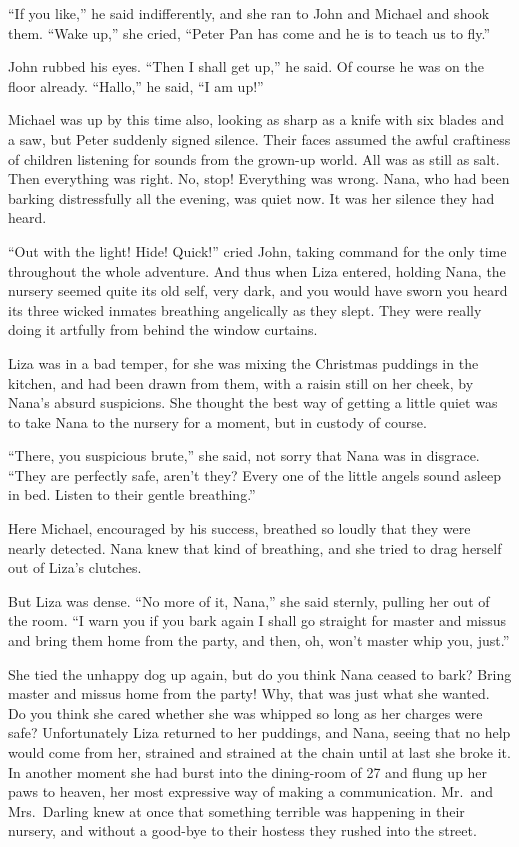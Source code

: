 ``If you like,'' he said indifferently, and she ran to John and Michael and
shook them. ``Wake up,'' she cried, ``Peter Pan has come and he is to teach us
to fly.''

John rubbed his eyes. ``Then I shall get up,'' he said. Of course he was on the
floor already. ``Hallo,'' he said, ``I am up!''

Michael was up by this time also, looking as sharp as a knife with six blades
and a saw, but Peter suddenly signed silence. Their faces assumed the awful
craftiness of children listening for sounds from the grown-up world. All was as
still as salt. Then everything was right. No, stop! Everything was wrong. Nana,
who had been barking distressfully all the evening, was quiet now. It was her
silence they had heard.

``Out with the light! Hide! Quick!'' cried John, taking command for the only
time throughout the whole adventure. And thus when Liza entered, holding Nana,
the nursery seemed quite its old self, very dark, and you would have sworn you
heard its three wicked inmates breathing angelically as they slept. They were
really doing it artfully from behind the window curtains.

Liza was in a bad temper, for she was mixing the Christmas puddings in the
kitchen, and had been drawn from them, with a raisin still on her cheek, by
Nana's absurd suspicions. She thought the best way of getting a little quiet was
to take Nana to the nursery for a moment, but in custody of course.

``There, you suspicious brute,'' she said, not sorry that Nana was in disgrace.
``They are perfectly safe, aren't they? Every one of the little angels sound
asleep in bed. Listen to their gentle breathing.''

Here Michael, encouraged by his success, breathed so loudly that they were
nearly detected. Nana knew that kind of breathing, and she tried to drag herself
out of Liza's clutches.

But Liza was dense. ``No more of it, Nana,'' she said sternly, pulling her out
of the room. ``I warn you if you bark again I shall go straight for master and
missus and bring them home from the party, and then, oh, won't master whip you,
just.''

She tied the unhappy dog up again, but do you think Nana ceased to bark? Bring
master and missus home from the party! Why, that was just what she wanted. Do
you think she cared whether she was whipped so long as her charges were safe?
Unfortunately Liza returned to her puddings, and Nana, seeing that no help would
come from her, strained and strained at the chain until at last she broke it. In
another moment she had burst into the dining-room of 27 and flung up her paws to
heaven, her most expressive way of making a communication. Mr.\ and
Mrs.\ Darling knew at once that something terrible was happening in their
nursery, and without a good-bye to their hostess they rushed into the street.

